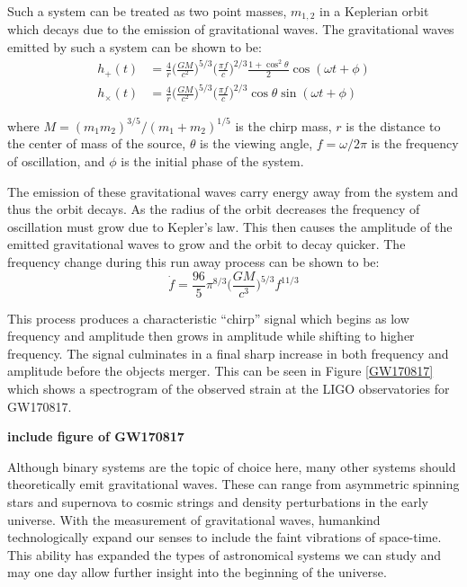 \documentclass [12pt, proquest]{uwthesis}[2019]
\begin{document}
Such a system can be treated as two point masses, $m_{1,2}$ in a Keplerian orbit which decays due to the emission of gravitational waves. The gravitational waves emitted by such a system can be shown to be:
\begin{align}
h_+(t)&=\frac{4}{r}\bigg(\frac{GM}{c^2}\bigg)^{5/3} \bigg( \frac{\pi f}{c} \bigg)^{2/3} \frac{1+\cos^2\theta}{2} \cos(\omega t + \phi)\\
h_\times(t)&=\frac{4}{r}\bigg(\frac{GM}{c^2}\bigg)^{5/3} \bigg( \frac{\pi f}{c} \bigg)^{2/3} \cos\theta \sin(\omega t + \phi)
\end{align}

where $M=(m_1 m_2)^{3/5}/(m_1+m_2)^{1/5}$ is the chirp mass, $r$ is the distance to the center of mass of the source, $\theta$ is the viewing angle, $f=\omega/2\pi$ is the frequency of oscillation, and $\phi$ is the initial phase of the system.

The emission of these gravitational waves carry energy away from the system and thus the orbit decays. As the radius of the orbit decreases the frequency of oscillation must grow due to Kepler's law. This then causes the amplitude of the emitted gravitational waves to grow and the orbit to decay quicker. The frequency change during this run away process can be shown to be:
\begin{equation}
\dot{f}=\frac{96}{5}\pi^{8/3}\bigg(\frac{G M}{c^3}\bigg)^{5/3} f^{11/3}
\end{equation}

This process produces a characteristic ``chirp'' signal which begins as low frequency and amplitude then grows in amplitude while shifting to higher frequency. The signal culminates in a final sharp increase in both frequency and amplitude before the objects merger. This can be seen in Figure \ref{GW170817} which shows a spectrogram of the observed strain at the LIGO observatories for GW170817.
 
 \textbf{include figure of GW170817}
 
 Although binary systems are the topic of choice here, many other systems should theoretically emit gravitational waves. These can range from asymmetric spinning stars and supernova to cosmic strings and density perturbations in the early universe. With the measurement of gravitational waves, humankind technologically expand our senses to include the faint vibrations of space-time. This ability has expanded the types of astronomical systems we can study and may one day allow further insight into the beginning of the universe.
\end{document}
